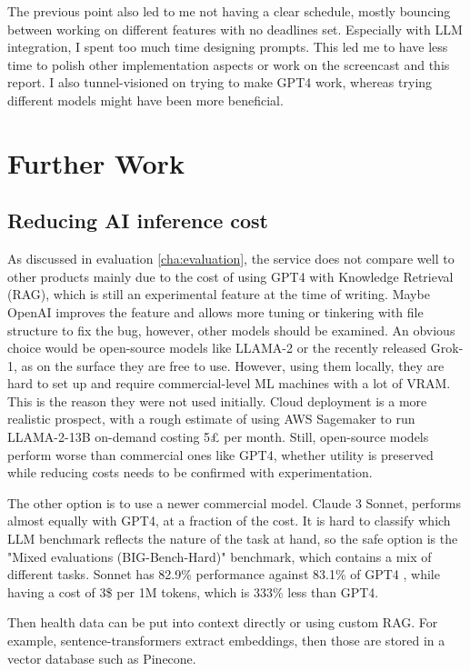 The previous point also led to me not having a clear schedule, mostly bouncing between working on different features with no deadlines set. Especially with LLM integration, I spent too much time designing prompts. This led me to have less time to polish other implementation aspects or work on the screencast and this report. I also tunnel-visioned on trying to make GPT4 work, whereas trying different models might have been more beneficial. 
\section{Further Work}
\subsection{Reducing AI inference cost}
\label{subsec:tryingOther}
As discussed in evaluation \ref{cha:evaluation}, the service does not compare well to other products mainly due to the cost of using GPT4 with Knowledge Retrieval (RAG), which is still an experimental feature at the time of writing. Maybe OpenAI improves the feature and allows more tuning or tinkering with file structure to fix the bug, however, other models should be examined. An obvious choice would be open-source models like LLAMA-2 or the recently released Grok-1, as on the surface they are free to use. However, using them locally, they are hard to set up and require commercial-level ML machines with a lot of VRAM. This is the reason they were not used initially. Cloud deployment is a more realistic prospect, with a rough estimate of using AWS Sagemaker to run LLAMA-2-13B on-demand costing 5£ per month. Still, open-source models perform worse than commercial ones like GPT4, whether utility is preserved while reducing costs needs to be confirmed with experimentation.

The other option is to use a newer commercial model. Claude 3 Sonnet, performs almost equally with GPT4, at a fraction of the cost. It is hard to classify which LLM benchmark reflects the nature of the task at hand, so the safe option is the "Mixed evaluations (BIG-Bench-Hard)" benchmark, which contains a mix of different tasks. Sonnet has 82.9\% performance against 83.1\% of GPT4 \cite{claude3Bench}, while having a cost of 3\$ per 1M tokens, which is 333\% less than GPT4.

Then health data can be put into context directly or using custom RAG. For example, sentence-transformers extract embeddings, then those are stored in a vector database such as Pinecone.

